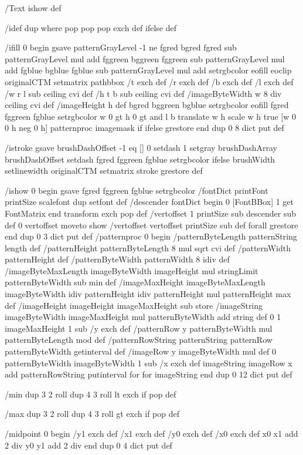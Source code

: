 /Text {
ishow
} def

/idef {
dup where { pop pop pop } { exch def } ifelse
} def

/ifill {
0 begin
gsave
patternGrayLevel -1 ne {
fgred bgred fgred sub patternGrayLevel mul add
fggreen bggreen fggreen sub patternGrayLevel mul add
fgblue bgblue fgblue sub patternGrayLevel mul add setrgbcolor
eofill
} {
eoclip
originalCTM setmatrix
pathbbox /t exch def /r exch def /b exch def /l exch def
/w r l sub ceiling cvi def
/h t b sub ceiling cvi def
/imageByteWidth w 8 div ceiling cvi def
/imageHeight h def
bgred bggreen bgblue setrgbcolor
eofill
fgred fggreen fgblue setrgbcolor
w 0 gt h 0 gt and {
l b translate w h scale
w h true [w 0 0 h neg 0 h] { patternproc } imagemask
} if
} ifelse
grestore
end
} dup 0 8 dict put def

/istroke {
gsave
brushDashOffset -1 eq {
[] 0 setdash
1 setgray
} {
brushDashArray brushDashOffset setdash
fgred fggreen fgblue setrgbcolor
} ifelse
brushWidth setlinewidth
originalCTM setmatrix
stroke
grestore
} def

/ishow {
0 begin
gsave
fgred fggreen fgblue setrgbcolor
/fontDict printFont printSize scalefont dup setfont def
/descender fontDict begin 0 [FontBBox] 1 get FontMatrix end
transform exch pop def
/vertoffset 1 printSize sub descender sub def {
0 vertoffset moveto show
/vertoffset vertoffset printSize sub def
} forall
grestore
end
} dup 0 3 dict put def
/patternproc {
0 begin
/patternByteLength patternString length def
/patternHeight patternByteLength 8 mul sqrt cvi def
/patternWidth patternHeight def
/patternByteWidth patternWidth 8 idiv def
/imageByteMaxLength imageByteWidth imageHeight mul
stringLimit patternByteWidth sub min def
/imageMaxHeight imageByteMaxLength imageByteWidth idiv patternHeight idiv
patternHeight mul patternHeight max def
/imageHeight imageHeight imageMaxHeight sub store
/imageString imageByteWidth imageMaxHeight mul patternByteWidth add string def
0 1 imageMaxHeight 1 sub {
/y exch def
/patternRow y patternByteWidth mul patternByteLength mod def
/patternRowString patternString patternRow patternByteWidth getinterval def
/imageRow y imageByteWidth mul def
0 patternByteWidth imageByteWidth 1 sub {
/x exch def
imageString imageRow x add patternRowString putinterval
} for
} for
imageString
end
} dup 0 12 dict put def

/min {
dup 3 2 roll dup 4 3 roll lt { exch } if pop
} def

/max {
dup 3 2 roll dup 4 3 roll gt { exch } if pop
} def

/midpoint {
0 begin
/y1 exch def
/x1 exch def
/y0 exch def
/x0 exch def
x0 x1 add 2 div
y0 y1 add 2 div
end
} dup 0 4 dict put def

